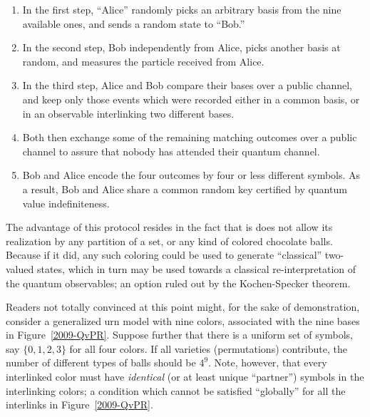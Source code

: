 \documentclass[12pt]{elsarticle}%
\begin{document}
\begin{enumerate}
\item
In the first step, ``Alice'' randomly picks an arbitrary basis from the nine available ones,
and sends a random state to ``Bob.''
\item
In the second step, Bob independently from Alice, picks another basis at random,
and measures the particle received from Alice.
\item
In the third step, Alice and Bob compare their bases over a public channel,
and keep only those events which were recorded either in a common basis,
or in an observable interlinking two different bases.
\item
Both then exchange some of the remaining matching outcomes  over a public channel to assure that nobody
has attended their quantum channel.
\item
Bob and Alice encode the four outcomes by four or less different symbols.
As a result, Bob and Alice share a common random key certified by quantum value indefiniteness.
\end{enumerate}


The advantage of this protocol resides in the fact that is does not allow its realization by
any partition of a set, or any kind of colored chocolate balls.
Because if it did, any such coloring could be used to generate ``classical'' two-valued states,
which in turn may be used towards a classical re-interpretation of the quantum observables; an option
ruled out by the Kochen-Specker theorem.

Readers  not  totally convinced at this point might, for the sake of demonstration,
consider a generalized urn model with nine colors, associated with the nine bases
in Figure~\ref{2009-QvPR}.
Suppose further that there is a uniform set of symbols, say $\{0,1,2,3\}$
for all four colors.
If all varieties (permutations) contribute, the number of different types of balls
should be $4^9$. Note, however, that every interlinked color must have {\em identical}
(or at least  unique ``partner'')
symbols in the interlinking colors; a condition which cannot be satisfied
``globally'' for all the interlinks in Figure~\ref{2009-QvPR}.
\end{document}
